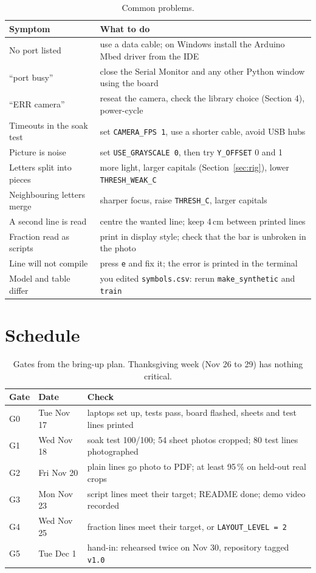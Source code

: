 \documentclass[11pt]{article}
\newcommand{\cmd}[1]{\texttt{#1}}
\begin{document}
\begin{table}[H]
\centering
\begin{tabular}{C{3.4cm}C{8.0cm}}
\toprule
\textbf{Symptom} & \textbf{What to do} \\
\midrule
No port listed & use a data cable; on Windows install the Arduino Mbed driver from the IDE \\
``port busy'' & close the Serial Monitor and any other Python window using the board \\
``ERR camera'' & reseat the camera, check the library choice (Section 4), power-cycle \\
Timeouts in the soak test & set \cmd{CAMERA\_FPS 1}, use a shorter cable, avoid USB hubs \\
Picture is noise & set \cmd{USE\_GRAYSCALE 0}, then try \cmd{Y\_OFFSET} 0 and 1 \\
Letters split into pieces & more light, larger capitals (Section~\ref{sec:rig}), lower \cmd{THRESH\_WEAK\_C} \\
Neighbouring letters merge & sharper focus, raise \cmd{THRESH\_C}, larger capitals \\
A second line is read & centre the wanted line; keep 4\,cm between printed lines \\
Fraction read as scripts & print in display style; check that the bar is unbroken in the photo \\
Line will not compile & press \cmd{e} and fix it; the error is printed in the terminal \\
Model and table differ & you edited \cmd{symbols.csv}: rerun \cmd{make\_synthetic} and \cmd{train} \\
\bottomrule
\end{tabular}
\caption{Common problems.}
\end{table}

\section{Schedule}

\begin{table}[H]
\centering
\begin{tabular}{C{1.2cm}C{2.4cm}C{7.4cm}}
\toprule
\textbf{Gate} & \textbf{Date} & \textbf{Check} \\
\midrule
G0 & Tue Nov 17 & laptops set up, tests pass, board flashed, sheets and test lines printed \\
G1 & Wed Nov 18 & soak test 100/100; 54 sheet photos cropped; 80 test lines photographed \\
G2 & Fri Nov 20 & plain lines go photo to PDF; at least 95\,\% on held-out real crops \\
G3 & Mon Nov 23 & script lines meet their target; README done; demo video recorded \\
G4 & Wed Nov 25 & fraction lines meet their target, or \cmd{LAYOUT\_LEVEL = 2} \\
G5 & Tue Dec 1 & hand-in: rehearsed twice on Nov 30, repository tagged \cmd{v1.0} \\
\bottomrule
\end{tabular}
\caption{Gates from the bring-up plan. Thanksgiving week (Nov 26 to 29) has nothing critical.}
\end{table}
\end{document}
